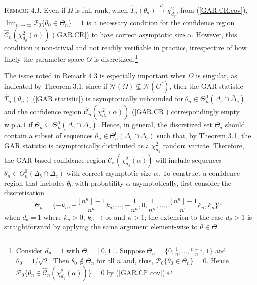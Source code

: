 \documentclass[hidelinks, 11 pt, a4paper, pdflatex]{article}
\begin{document}
{   \textsc{Remark 4.3}. Even if $\Omega$ is full rank, when $\hat{T}_{n}(\theta _{n}) \overset{d}{\rightarrow} \chi_{d_{g}}^{2}$, from (\ref{GAR.CR.cov}), $\lim_{n \rightarrow \infty}
    \mathcal{P}_0 \{\theta_{0} \in \Theta_{n}\} = 1$ is a necessary condition for the confidence region $\hat{\mathcal{C}}_{n}(\chi_{d_{g}}^{2}(\alpha))$ (\ref{GAR.CR}) to have correct asymptotic size $\alpha$. However, this condition is non-trivial and not readily verifiable in practice, irrespective of how finely the parameter space $\Theta$ is discretized.\footnote{Consider $d_{\theta} = 1$ with $\Theta =[0,1]$. Suppose $\Theta_{n} = \{0,\frac{1}{n},...,\frac{n-1}{n},1\}$ and $\theta_{0} = 1/\sqrt{2}$. Then $\theta_{0}
    \notin \Theta_{n}$ for all $n$ and, thus, $\mathcal{P}_0 \{\theta_{0} \in \Theta_{n}\} = 0$. Hence $\mathcal{P}_0 \{\theta_{n} \in \hat{\mathcal{C}}_{n}(\chi_{d_{g}}^{2}(\alpha))\} = 0$ by (\ref{GAR.CR.cov}).}

  The issue noted in Remark 4.3 is especially important when $\Omega$ is singular, as indicated by Theorem 3.1, since if $\mathcal{N}(\Omega) \nsubseteq \mathcal{N}(G^{\prime})$, then the GAR statistic $\hat{T}_{n}(\theta_{n})$ (\ref{GAR.statistic}) is asymptotically unbounded for $\theta_{n} \in \Theta_{n}^{0}(\Delta_{b} \cap \bar{\Delta}_{c})$ and the confidence region $\hat{\mathcal{C}}_{n}(\chi_{d_{g}}^{2}(\alpha))$ (\ref{GAR.CR}) correspondingly empty w.p.a.$1$ if $\Theta_n \subseteq \Theta_{n}^{0}(\Delta_{b} \cap \bar{\Delta}_{c})$. Hence, in general, the discretized set $\Theta_{n}$ should contain a subset of sequences $\theta_{n} \in \Theta_{n}^{0}(\Delta _{b} \cap \Delta_{c})$ such that, by Theorem 3.1, the GAR statistic is asymptotically distributed as a $\chi_{d_{g}}^{2}$ random variate. Therefore, the GAR-based confidence region $\hat{\mathcal{C}}_{n}(\chi_{d_{g}}^{2}(\alpha))$ will include sequences $\theta_{n} \in \Theta_{n}^{0}(\Delta_{b} \cap \Delta_{c})$ with correct asymptotic size $\alpha$. To construct a confidence region that includes $\theta_{0}$ with probability $\alpha$ asymptotically, first consider the discretisation
   \begin{equation}\label{GAR.CR.discretn}
    \Theta_{n} = \{-k_{n},-\frac{[n^{\kappa }]-1}{n^{\kappa }}k_{n},...,-\frac{1}{n^{\kappa }},0,\frac{1}{n^{\kappa }},...,\frac{[n^{\kappa }]-1}{n^{\kappa }}k_{n},k_{n}\}^{d_{\theta }}
   \end{equation}
  when $d_{\theta} = 1$ where $k_{n} > 0$, $k_{n} \rightarrow \infty$ and $\kappa > 1$; the extension to the case $d_{\theta} > 1$ is straightforward by applying the same argument element-wise to $\theta \in \Theta$.

}
\end{document}
